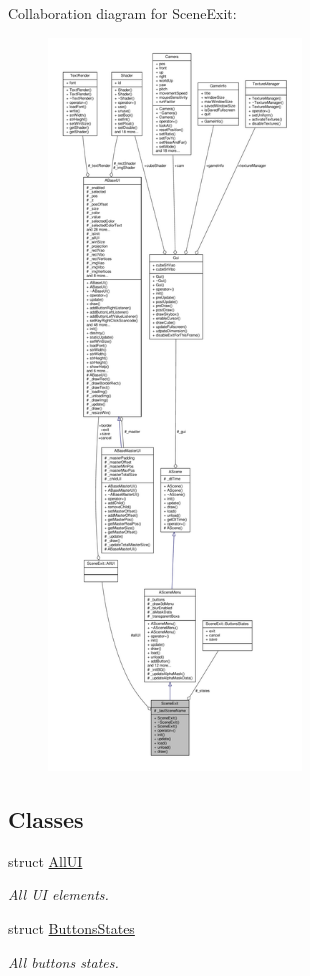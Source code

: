 Collaboration diagram for Scene\+Exit\+:
\nopagebreak
\begin{figure}[H]
\begin{center}
\leavevmode
\includegraphics[height=550pt]{class_scene_exit__coll__graph}
\end{center}
\end{figure}
\subsection*{Classes}
\begin{DoxyCompactItemize}
\item 
struct \hyperlink{struct_scene_exit_1_1_all_u_i}{All\+UI}
\begin{DoxyCompactList}\small\item\em All UI elements. \end{DoxyCompactList}\item 
struct \hyperlink{struct_scene_exit_1_1_buttons_states}{Buttons\+States}
\begin{DoxyCompactList}\small\item\em All buttons states. \end{DoxyCompactList}\end{DoxyCompactItemize}
